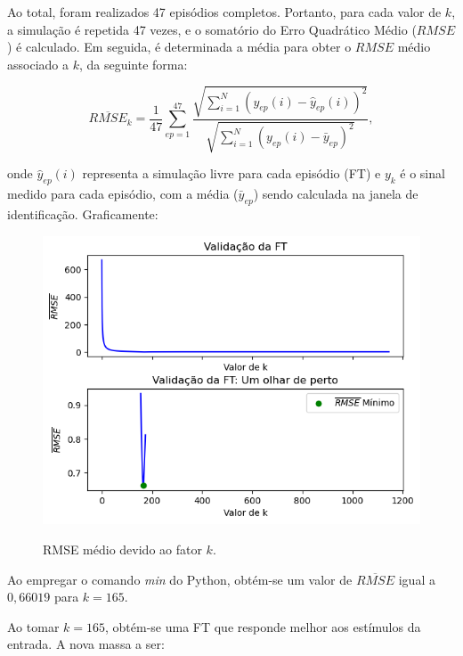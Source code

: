 \documentclass[12pt,           %
a4paper,                       %
openany,                       %
oneside,                       %
chapter=TITLE,                 %
english,                       %
spanish,                       %
brazil,                        %
sumario=tradicional]{abntex2}  %
\begin{document}
\begin{OnehalfSpace}
Ao total, foram realizados 47 episódios completos. Portanto, para cada valor de \(k\), a simulação é repetida 47 vezes, e o somatório do Erro Quadrático Médio (\(RMSE\))\cite{aguirre2004} é calculado. Em seguida, é determinada a média para obter o \(RMSE\) médio associado a \(k\), da seguinte forma:

\begin{equation}
    \overline{RMSE}_k = \frac{1}{47} \sum_{ep=1}^{47} \frac{\sqrt{\sum_{i=1}^{N}(y_{ep}(i)-\hat{y}_{ep}(i))^2}}{\sqrt{\sum_{i=1}^{N}(y_{ep}(i)-\bar{y}_{ep})^2}},
\label{eq:RMSE}
\end{equation}

\noindent onde $\hat{y}_{ep}(i)$ representa a simulação livre para cada episódio (FT) e ${y}_k$ é o sinal medido para cada episódio, com a média ($\bar{y}_{ep}$) sendo calculada na janela de identificação. Graficamente:

\begin{figure}[H]
     \centering
     \vspace*{-0.25cm}
     \caption{RMSE médio devido ao fator $k$.}
     \includegraphics[scale=.6]{RMSE1.png}
     \label{fig:R}
\end{figure}
\vspace*{-.85cm}
{\raggedright {}}

Ao empregar o comando \textit{min} do Python, obtém-se um valor de $\overline{RMSE}$ igual a $0,66019$ para $k=165$.

Ao tomar $k=165$, obtém-se uma FT que responde melhor aos estímulos da entrada. A nova massa a ser:


\end{OnehalfSpace}
\end{document}
